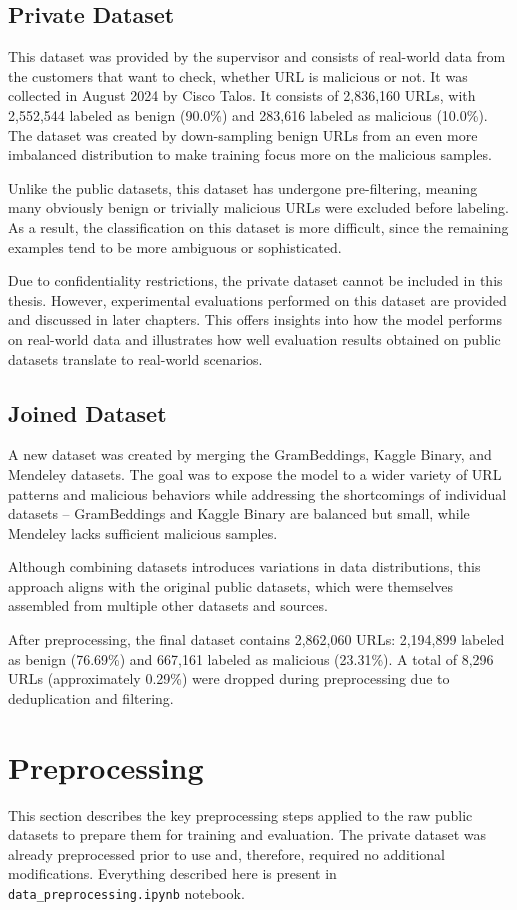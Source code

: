 \subsection{Private Dataset}
\label{sec:private_dataset}
This dataset was provided by the supervisor and consists of real-world data from the customers that want to check, whether URL is malicious or not. It was collected in August 2024 by Cisco Talos. It consists of 2,836,160 URLs, with 2,552,544 labeled as benign (90.0\%) and 283,616 labeled as malicious (10.0\%). The dataset was created by down-sampling benign URLs from an even more imbalanced distribution to make training focus more on the malicious samples.

Unlike the public datasets, this dataset has undergone pre-filtering, meaning many obviously benign or trivially malicious URLs were excluded before labeling. As a result, the classification on this dataset is more difficult, since the remaining examples tend to be more ambiguous or sophisticated.

Due to confidentiality restrictions, the private dataset cannot be included in this thesis. However, experimental evaluations performed on this dataset are provided and discussed in later chapters. This offers insights into how the model performs on real-world data and illustrates how well evaluation results obtained on public datasets translate to real-world scenarios.

\subsection{Joined Dataset}
A new dataset was created by merging the GramBeddings, Kaggle Binary, and Mendeley datasets. The goal was to expose the model to a wider variety of URL patterns and malicious behaviors while addressing the shortcomings of individual datasets -- GramBeddings and Kaggle Binary are balanced but small, while Mendeley lacks sufficient malicious samples.

Although combining datasets introduces variations in data distributions, this approach aligns with the original public datasets, which were themselves assembled from multiple other datasets and sources.

After preprocessing, the final dataset contains 2,862,060 URLs: 2,194,899 labeled as benign (76.69\%) and 667,161 labeled as malicious (23.31\%). A total of 8,296 URLs (approximately 0.29\%) were dropped during preprocessing due to deduplication and filtering.

\section{Preprocessing}
This section describes the key preprocessing steps applied to the raw public datasets to prepare them for training and evaluation. The private dataset was already preprocessed prior to use and, therefore, required no additional modifications. Everything described here is present in \texttt{data\_preprocessing.ipynb} notebook.

